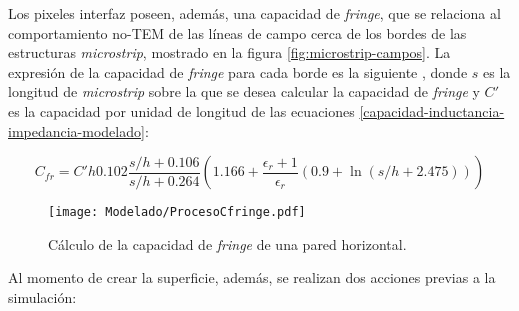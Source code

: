Los pixeles interfaz poseen, además, una capacidad de \textit{fringe}, que se relaciona al comportamiento no-TEM de las líneas de campo cerca de los bordes de las estructuras \textit{microstrip}, mostrado en la figura \ref{fig:microstrip-campos}. La expresión de la capacidad de \textit{fringe} para cada borde es la siguiente \cite{Hammerstad:discont}, donde $s$ es la longitud de \textit{microstrip} sobre la que se desea calcular la capacidad de \textit{fringe} y $C'$ es la capacidad por unidad de longitud de las ecuaciones \ref{capacidad-inductancia-impedancia-modelado}:

\begin{equation}
	C_{fr} = C' h 0.102 \frac{s/h+0.106}{s/h+0.264} \left(1.166 + \frac{\epsilon_r+1}{\epsilon_r} (0.9+\ln(s/h+2.475)) \right)
\end{equation}

\begin{figure}[h]
	\centering
	\texttt{[image: Modelado/ProcesoCfringe.pdf]}
	\caption{Cálculo de la capacidad de \textit{fringe} de una pared horizontal.}
	\label{fig:profundidad-para-cfringe}
\end{figure}

Al momento de crear la superficie, además, se realizan dos acciones previas a la simulación:

